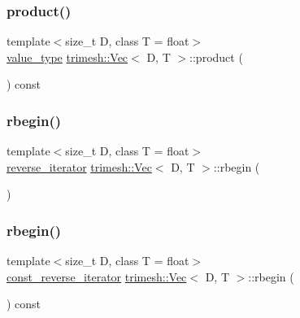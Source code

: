 \mbox{\label{classtrimesh_1_1Vec_aafbd5627531af41c0dd50e0bccbe26d7}} 
\subsubsection{\texorpdfstring{product()}{product()}}
{\footnotesize\ttfamily template$<$size\+\_\+t D, class T = float$>$ \\
\hyperlink{classtrimesh_1_1Vec_a10a59253996e42d67c713f37592669df}{value\+\_\+type} \hyperlink{classtrimesh_1_1Vec}{trimesh\+::\+Vec}$<$ D, T $>$\+::product (\begin{DoxyParamCaption}{ }\end{DoxyParamCaption}) const\hspace{0.3cm}{\ttfamily [inline]}}

\mbox{\label{classtrimesh_1_1Vec_a0e0c475283b1fd98ecf59c4f508f0f91}} 
\subsubsection{\texorpdfstring{rbegin()}{rbegin()}\hspace{0.1cm}{\footnotesize\ttfamily [1/2]}}
{\footnotesize\ttfamily template$<$size\+\_\+t D, class T = float$>$ \\
\hyperlink{classtrimesh_1_1Vec_a42a460e6f54561faf9975298d46807ec}{reverse\+\_\+iterator} \hyperlink{classtrimesh_1_1Vec}{trimesh\+::\+Vec}$<$ D, T $>$\+::rbegin (\begin{DoxyParamCaption}{ }\end{DoxyParamCaption})\hspace{0.3cm}{\ttfamily [inline]}}

\mbox{\label{classtrimesh_1_1Vec_a08f4c9e0e39010805c6e21aca0fa0a8f}} 
\subsubsection{\texorpdfstring{rbegin()}{rbegin()}\hspace{0.1cm}{\footnotesize\ttfamily [2/2]}}
{\footnotesize\ttfamily template$<$size\+\_\+t D, class T = float$>$ \\
\hyperlink{classtrimesh_1_1Vec_a0f78ea50431013f8f15b6286efc0dccd}{const\+\_\+reverse\+\_\+iterator} \hyperlink{classtrimesh_1_1Vec}{trimesh\+::\+Vec}$<$ D, T $>$\+::rbegin (\begin{DoxyParamCaption}{ }\end{DoxyParamCaption}) const\hspace{0.3cm}{\ttfamily [inline]}}

